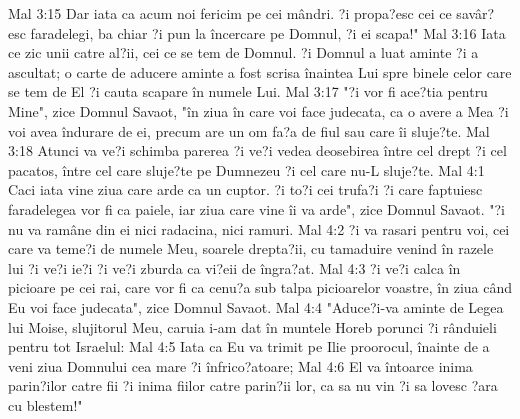 Mal 3:15  Dar iata ca acum noi fericim pe cei mândri. ?i propa?esc cei ce savâr?esc faradelegi, ba chiar ?i pun la încercare pe Domnul, ?i ei scapa!"
Mal 3:16  Iata ce zic unii catre al?ii, cei ce se tem de Domnul. ?i Domnul a luat aminte ?i a ascultat; o carte de aducere aminte a fost scrisa înaintea Lui spre binele celor care se tem de El ?i cauta scapare în numele Lui.
Mal 3:17  "?i vor fi ace?tia pentru Mine", zice Domnul Savaot, "în ziua în care voi face judecata, ca o avere a Mea ?i voi avea îndurare de ei, precum are un om fa?a de fiul sau care îi sluje?te.
Mal 3:18  Atunci va ve?i schimba parerea ?i ve?i vedea deosebirea între cel drept ?i cel pacatos, între cel care sluje?te pe Dumnezeu ?i cel care nu-L sluje?te.
Mal 4:1  Caci iata vine ziua care arde ca un cuptor. ?i to?i cei trufa?i ?i care faptuiesc faradelegea vor fi ca paiele, iar ziua care vine îi va arde", zice Domnul Savaot. "?i nu va ramâne din ei nici radacina, nici ramuri.
Mal 4:2  ?i va rasari pentru voi, cei care va teme?i de numele Meu, soarele drepta?ii, cu tamaduire venind în razele lui ?i ve?i ie?i ?i ve?i zburda ca vi?eii de îngra?at.
Mal 4:3  ?i ve?i calca în picioare pe cei rai, care vor fi ca cenu?a sub talpa picioarelor voastre, în ziua când Eu voi face judecata", zice Domnul Savaot.
Mal 4:4  "Aduce?i-va aminte de Legea lui Moise, slujitorul Meu, caruia i-am dat în muntele Horeb porunci ?i rânduieli pentru tot Israelul:
Mal 4:5  Iata ca Eu va trimit pe Ilie proorocul, înainte de a veni ziua Domnului cea mare ?i înfrico?atoare;
Mal 4:6  El va întoarce inima parin?ilor catre fii ?i inima fiilor catre parin?ii lor, ca sa nu vin ?i sa lovesc ?ara cu blestem!"


